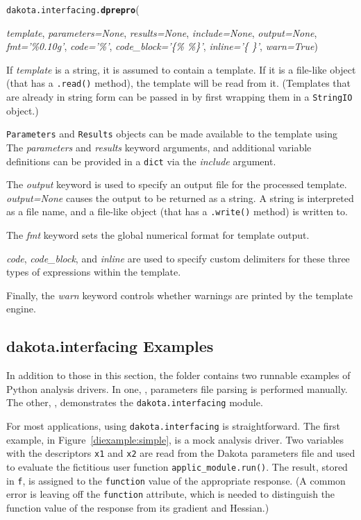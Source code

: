 \label{index:dakota.interfacing.dprepro}\texttt{dakota.interfacing.}\textbf{\texttt{dprepro}}({\emph{template}, \emph{parameters=None}, \emph{results=None}, \emph{include=None},
	\emph{output=None}, \emph{fmt='\%0.10g'}, \emph{code='\%'}, \emph{code\_block='\{\% \%\}'},
		\emph{inline='\{ \}'}, \emph{warn=True}){}

If \emph{template} is a string, it is assumed to contain a template. If it 
is a file-like object (that has a \texttt{.read()}
method), the template will be read from it. (Templates that are already in
string form can be passed in by first wrapping them in a \texttt{StringIO}
object.)

\texttt{Parameters} and \texttt{Results} objects can be made available to the
template using The \emph{parameters} and \emph{results} keyword arguments, and 
additional variable definitions can be provided in a \texttt{dict} via the
\emph{include} argument.

The \emph{output} keyword is used to specify an output file for the processed 
template. \emph{output=None} causes the output to be returned as a string. A
string is interpreted as a file name, and a file-like object (that has a 
\texttt{.write()} method) is written to.

The \emph{fmt} keyword sets the global numerical format for template output.

\emph{code}, \emph{code\_block}, and \emph{inline} are used to specify custom 
delimiters for these three types of expressions within the template.

Finally, the \emph{warn} keyword controls whether warnings are printed by the
template engine.

\subsection{dakota.interfacing Examples}

In addition to those in this section, the  folder contains two runnable examples of Python analysis drivers. In one, , parameters file parsing is performed manually. The other, , demonstrates the {\tt dakota.interfacing} module.

For most applications, using {\tt dakota.interfacing} is straightforward. The first example, in Figure~\ref{diexample:simple}, is a mock analysis driver. Two variables with the descriptors {\tt x1} and {\tt x2} are read from the Dakota parameters file and used to evaluate the fictitious user function {\tt applic\_module.run()}. The result, stored in {\tt f}, is assigned to the {\tt function} value of the appropriate response. (A common error is leaving off the {\tt function} attribute, which is needed to distinguish the function value of the response from its gradient and Hessian.)

}
